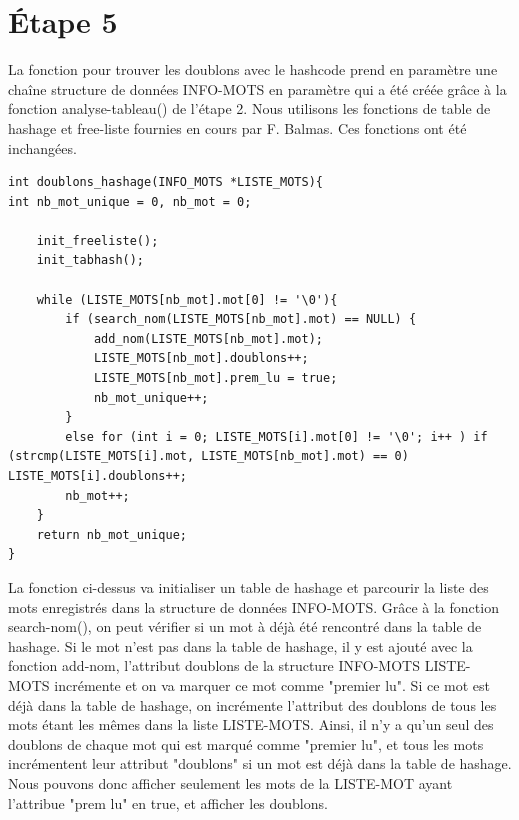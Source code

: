 \documentclass{article}
\begin{document}
\section*{Étape 5}
La fonction pour trouver les doublons avec le hashcode prend en paramètre une chaîne structure de données INFO-MOTS en paramètre qui a été créée grâce à la fonction analyse-tableau() de l'étape 2. Nous utilisons les fonctions de table de hashage et free-liste fournies en cours par F. Balmas. Ces fonctions ont été inchangées.\newline
\begin{lstlisting}[style=Cstyle]
int doublons_hashage(INFO_MOTS *LISTE_MOTS){
int nb_mot_unique = 0, nb_mot = 0;

    init_freeliste();
    init_tabhash();

    while (LISTE_MOTS[nb_mot].mot[0] != '\0'){
        if (search_nom(LISTE_MOTS[nb_mot].mot) == NULL) {
            add_nom(LISTE_MOTS[nb_mot].mot);
            LISTE_MOTS[nb_mot].doublons++;
            LISTE_MOTS[nb_mot].prem_lu = true;
            nb_mot_unique++;
        }
        else for (int i = 0; LISTE_MOTS[i].mot[0] != '\0'; i++ ) if (strcmp(LISTE_MOTS[i].mot, LISTE_MOTS[nb_mot].mot) == 0) LISTE_MOTS[i].doublons++;
        nb_mot++;
    }
    return nb_mot_unique;
}
\end{lstlisting}
La fonction ci-dessus va initialiser un table de hashage et parcourir la liste des mots enregistrés dans la structure de données INFO-MOTS. Grâce à la fonction search-nom(), on peut vérifier si un mot à déjà été rencontré dans la table de hashage. Si le mot n'est pas dans la table de hashage, il y est ajouté avec la fonction add-nom, l'attribut doublons de la structure INFO-MOTS LISTE-MOTS incrémente et on va marquer ce mot comme "premier lu". Si ce mot est déjà dans la table de hashage, on incrémente l'attribut des doublons de tous les mots étant les mêmes dans la liste LISTE-MOTS. Ainsi, il n'y a qu'un seul des doublons de chaque mot qui est marqué comme "premier lu", et tous les mots incrémentent leur attribut "doublons" si un mot est déjà dans la table de hashage. Nous pouvons donc afficher seulement les mots de la LISTE-MOT ayant l'attribue "prem lu" en true, et afficher les doublons.
\end{document}
